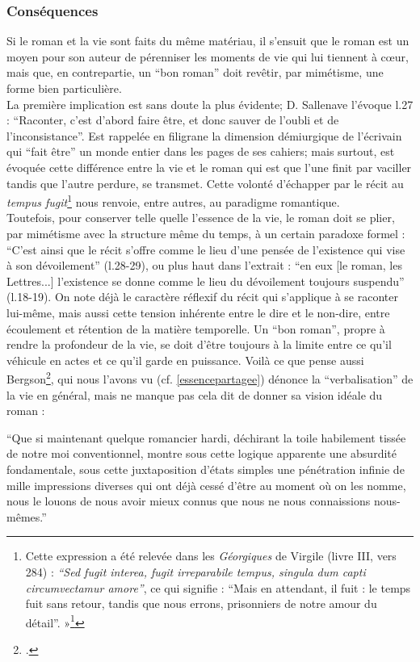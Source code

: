 \documentclass[a4paper,10pt]{article}
\begin{document}
			\subsubsection{Conséquences}
				Si le roman et la vie sont faits du même matériau, il s'ensuit que le roman est un moyen pour son auteur de pérenniser les moments de vie qui lui tiennent à cœur, mais que, en contrepartie, un ``bon roman'' doit revêtir, par mimétisme, une forme bien particulière.\\
				La première implication est sans doute la plus évidente; D. Sallenave l'évoque l.27 : ``Raconter, c'est d'abord faire être, et donc sauver de l'oubli et de l'inconsistance''.  Est rappelée en filigrane la dimension démiurgique de l'écrivain qui ``fait être'' un monde entier dans les pages de ses cahiers; mais surtout, est évoquée cette différence entre la vie et le roman qui est que l'une finit par vaciller tandis que l'autre perdure, se transmet. Cette volonté d'échapper par le récit au \textit{tempus fugit}\footnote{Cette expression a été relevée dans les \textit{Géorgiques} de Virgile (livre III, vers 284) : \textit{``Sed fugit interea, fugit irreparabile tempus, singula dum capti circumvectamur amore''}, ce qui signifie : ``Mais en attendant, il fuit : le temps fuit sans retour, tandis que nous errons, prisonniers de notre amour du détail''. »\footcite{WikiTempus}} nous renvoie, entre autres, au paradigme romantique.\\
				Toutefois, pour conserver telle quelle l'essence de la vie, le roman doit se plier, par mimétisme avec la structure même du temps, à un certain paradoxe formel : ``C'est ainsi que le récit s'offre comme le lieu d'une pensée de l'existence qui vise à son dévoilement'' (l.28-29), ou plus haut dans l'extrait : ``en eux [le roman, les Lettres...] l'existence se donne comme le lieu du dévoilement toujours suspendu'' (l.18-19). On note déjà le caractère réflexif du récit qui s'applique à se raconter lui-même, mais aussi cette tension inhérente entre le dire et le non-dire, entre écoulement et rétention de la matière temporelle. Un ``bon roman'', propre à rendre la profondeur de la vie, se doit d'être toujours à la limite entre ce qu'il véhicule en actes et ce qu'il garde en puissance. Voilà ce que pense aussi Bergson\footcite{Bergson1889}, qui nous l'avons vu (cf. \ref{essencepartagee}) dénonce la ``verbalisation'' de la vie en général, mais ne manque pas cela dit de donner sa vision idéale du roman :
				\begin{center}
					\footnotesize
					\begin{minipage}{0.7\textwidth}
						``Que si maintenant quelque romancier hardi, déchirant la toile habilement tissée de notre moi conventionnel, montre sous cette logique apparente une absurdité fondamentale, sous cette juxtaposition d’états simples une pénétration infinie de mille impressions diverses qui ont déjà cessé d’être au moment où on les nomme, nous le louons de nous avoir mieux connus que nous ne nous connaissions nous-mêmes.''
					\end{minipage}
				\end{center}
\end{document}
